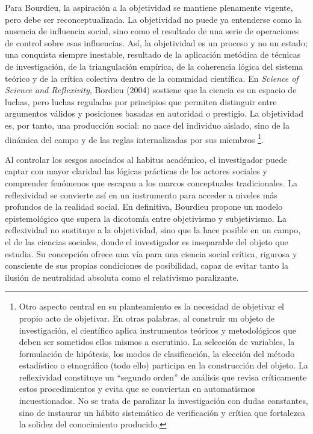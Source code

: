 \documentclass[
  spanish,
  letterpaper,
  DIV=11,
  numbers=noendperiod]{scrreprt}
\begin{document}
Para Bourdieu, la aspiración a la objetividad se mantiene plenamente
vigente, pero debe ser reconceptualizada. La objetividad no puede ya
entenderse como la ausencia de influencia social, sino como el resultado
de una serie de operaciones de control sobre esas influencias. Así, la
objetividad es un proceso y no un estado; una conquista siempre
inestable, resultado de la aplicación metódica de técnicas de
investigación, de la triangulación empírica, de la coherencia lógica del
sistema teórico y de la crítica colectiva dentro de la comunidad
científica. En \emph{Science of Science and Reflexivity}, Bordieu (2004)
sostiene que la ciencia es un espacio de luchas, pero luchas reguladas
por principios que permiten distinguir entre argumentos válidos y
posiciones basadas en autoridad o prestigio. La objetividad es, por
tanto, una producción social: no nace del individuo aislado, sino de la
dinámica del campo y de las reglas internalizadas por sus miembros
\footnote{Otro aspecto central en su planteamiento es la necesidad de
  objetivar el propio acto de objetivar. En otras palabras, al construir
  un objeto de investigación, el científico aplica instrumentos teóricos
  y metodológicos que deben ser sometidos ellos mismos a escrutinio. La
  selección de variables, la formulación de hipótesis, los modos de
  clasificación, la elección del método estadístico o etnográfico (todo
  ello) participa en la construcción del objeto. La reflexividad
  constituye un ``segundo orden'' de análisis que revisa críticamente
  estos procedimientos y evita que se conviertan en automatismos
  incuestionados. No se trata de paralizar la investigación con dudas
  constantes, sino de instaurar un hábito sistemático de verificación y
  crítica que fortalezca la solidez del conocimiento producido.}.

Al controlar los sesgos asociados al habitus académico, el investigador
puede captar con mayor claridad las lógicas prácticas de los actores
sociales y comprender fenómenos que escapan a los marcos conceptuales
tradicionales. La reflexividad se convierte así en un instrumento para
acceder a niveles más profundos de la realidad social. En definitiva,
Bourdieu propone un modelo epistemológico que supera la dicotomía entre
objetivismo y subjetivismo. La reflexividad no sustituye a la
objetividad, sino que la hace posible en un campo, el de las ciencias
sociales, donde el investigador es inseparable del objeto que estudia.
Su concepción ofrece una vía para una ciencia social crítica, rigurosa y
consciente de sus propias condiciones de posibilidad, capaz de evitar
tanto la ilusión de neutralidad absoluta como el relativismo
paralizante.
\end{document}
